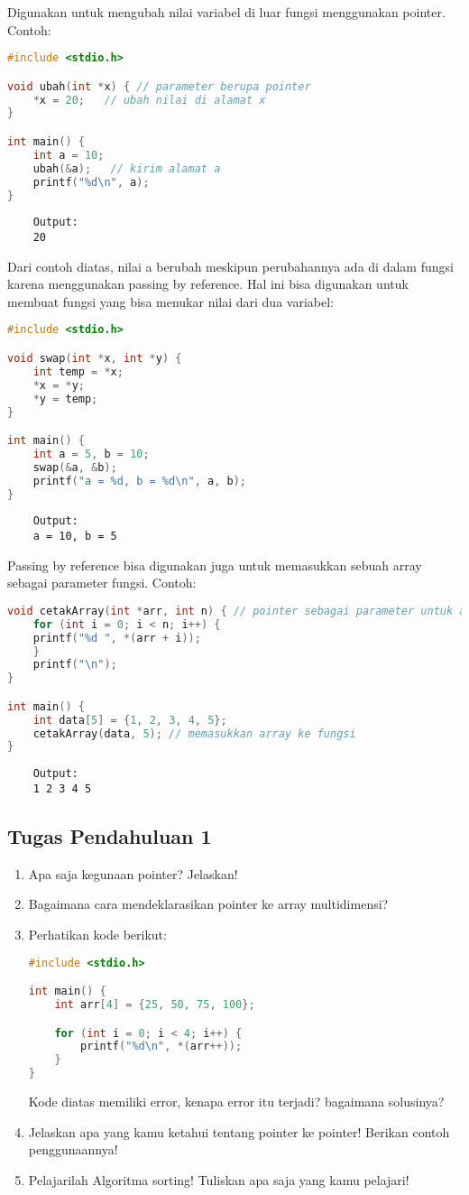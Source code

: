 Digunakan untuk mengubah nilai variabel di luar fungsi menggunakan pointer.
Contoh:
\begin{lstlisting}[language=c]
#include <stdio.h>

void ubah(int *x) { // parameter berupa pointer
	*x = 20;   // ubah nilai di alamat x
}

int main() {
	int a = 10;
	ubah(&a);   // kirim alamat a
	printf("%d\n", a);
}
\end{lstlisting}
\begin{verbatim}
	Output:
	20
\end{verbatim}
Dari contoh diatas, nilai a berubah meskipun perubahannya ada di dalam fungsi karena menggunakan passing by reference.
Hal ini bisa digunakan untuk membuat fungsi yang bisa menukar nilai dari dua variabel:
\begin{lstlisting}[language=c]
#include <stdio.h>

void swap(int *x, int *y) {
	int temp = *x;
	*x = *y;
	*y = temp;
}

int main() {
	int a = 5, b = 10;
	swap(&a, &b);
	printf("a = %d, b = %d\n", a, b);
}
\end{lstlisting}
\begin{verbatim}
	Output:
	a = 10, b = 5
\end{verbatim}
Passing by reference bisa digunakan juga untuk memasukkan sebuah array sebagai parameter fungsi.
Contoh:
\begin{lstlisting}[language=c]
void cetakArray(int *arr, int n) { // pointer sebagai parameter untuk array
	for (int i = 0; i < n; i++) {
	printf("%d ", *(arr + i));
	}
	printf("\n");
}

int main() {
	int data[5] = {1, 2, 3, 4, 5};
	cetakArray(data, 5); // memasukkan array ke fungsi
}
\end{lstlisting}
\begin{verbatim}
    Output:
    1 2 3 4 5     
\end{verbatim}

\subsection*{Tugas Pendahuluan 1}
\begin{enumerate}
    \item Apa saja kegunaan pointer? Jelaskan!
    \item Bagaimana cara mendeklarasikan pointer ke array multidimensi?
    \item Perhatikan kode berikut:
    \begin{lstlisting}[language=c]
#include <stdio.h>

int main() {
	int arr[4] = {25, 50, 75, 100};

	for (int i = 0; i < 4; i++) {
		printf("%d\n", *(arr++));
	}
}
\end{lstlisting}
    Kode diatas memiliki error, kenapa error itu terjadi? bagaimana solusinya?
    \item Jelaskan apa yang kamu ketahui tentang pointer ke pointer! Berikan contoh penggunaannya!
    \item Pelajarilah Algoritma sorting! Tuliskan apa saja yang kamu pelajari!

\end{enumerate}

